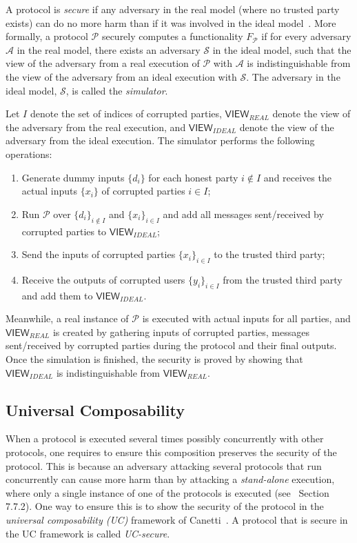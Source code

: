 \documentclass[10pt]{article}
\theoremstyle{plain}
\begin{document}
A protocol is \emph{secure} if any adversary in the real model (where
no trusted party exists) can do no more harm than if it was involved
in the ideal model~\cite[Section 4.3]{Goldreich:2000:FCB:519078}.
More formally, a protocol $\mathcal{P}$ securely computes a functionality
$F_{\mathcal{P}}$ if for every adversary $\mathcal{A}$ in the real
model, there exists an adversary $\mathcal{S}$ in the ideal model,
such that the view of the adversary from a real execution of $\mathcal{P}$
with $\mathcal{A}$ is indistinguishable from the view of the adversary
from an ideal execution with $\mathcal{S}$. The adversary in the
ideal model, $\mathcal{S}$, is called the \emph{simulator}.

Let $I$ denote the set of indices of corrupted parties, $\mathsf{VIEW}_{REAL}$
denote the view of the adversary from the real execution, and $\mathsf{VIEW}_{IDEAL}$
denote the view of the adversary from the ideal execution. The simulator
performs the following operations:
\begin{enumerate}
	\item Generate dummy inputs $\{d_{i}\}$ for each honest party $i\notin I$
	and receives the actual inputs $\{x_{i}\}$ of corrupted parties $i\in I$;
	\item Run $\mathcal{P}$ over $\{d_{i}\}_{i\notin I}$ and $\{x_{i}\}_{i\in I}$
	and add all messages sent/received by corrupted parties to $\mathsf{VIEW}_{IDEAL}$;
	\item Send the inputs of corrupted parties $\{x_{i}\}_{i\in I}$ to the
	trusted third party;
	\item Receive the outputs of corrupted users $\{y_{i}\}_{i\in I}$ from
	the trusted third party and add them to $\mathsf{VIEW}_{IDEAL}$.
\end{enumerate}
Meanwhile, a real instance of $\mathcal{P}$ is executed with actual
inputs for all parties, and $\mathsf{VIEW}_{REAL}$ is created by
gathering inputs of corrupted parties, messages sent/received by corrupted
parties during the protocol and their final outputs. Once the simulation
is finished, the security is proved by showing that $\mathsf{VIEW}_{IDEAL}$
is indistinguishable from $\mathsf{VIEW}_{REAL}$.

\subsection{Universal Composability}

When a protocol is executed several times possibly concurrently with
other protocols, one requires to ensure this composition preserves
the security of the protocol. This is because an adversary attacking
several protocols that run concurrently can cause more harm than by
attacking a \emph{stand-alone} execution, where only a single instance
of one of the protocols is executed (see~\cite{Goldreich:2004:FCV:975541}
Section 7.7.2). One way to ensure this is to show the security of
the protocol in the \emph{universal composability (UC)} framework
of Canetti~\cite{Canetti:UCSecurity:2001}. A protocol that is secure
in the UC framework is called \emph{UC-secure}.
\end{document}
